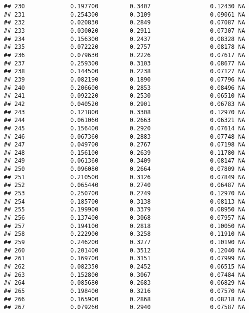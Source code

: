 \documentclass[
]{article}
\begin{document}
\begin{verbatim}
## 230             0.197700         0.3407                 0.12430 NA
## 231             0.254300         0.3109                 0.09061 NA
## 232             0.020830         0.2849                 0.07087 NA
## 233             0.030020         0.2911                 0.07307 NA
## 234             0.156300         0.2437                 0.08328 NA
## 235             0.072220         0.2757                 0.08178 NA
## 236             0.079630         0.2226                 0.07617 NA
## 237             0.259300         0.3103                 0.08677 NA
## 238             0.144500         0.2238                 0.07127 NA
## 239             0.082190         0.1890                 0.07796 NA
## 240             0.206600         0.2853                 0.08496 NA
## 241             0.092220         0.2530                 0.06510 NA
## 242             0.040520         0.2901                 0.06783 NA
## 243             0.121800         0.3308                 0.12970 NA
## 244             0.061060         0.2663                 0.06321 NA
## 245             0.156400         0.2920                 0.07614 NA
## 246             0.067360         0.2883                 0.07748 NA
## 247             0.049700         0.2767                 0.07198 NA
## 248             0.156100         0.2639                 0.11780 NA
## 249             0.061360         0.3409                 0.08147 NA
## 250             0.096080         0.2664                 0.07809 NA
## 251             0.210500         0.3126                 0.07849 NA
## 252             0.065440         0.2740                 0.06487 NA
## 253             0.250700         0.2749                 0.12970 NA
## 254             0.185700         0.3138                 0.08113 NA
## 255             0.199900         0.3379                 0.08950 NA
## 256             0.137400         0.3068                 0.07957 NA
## 257             0.194100         0.2818                 0.10050 NA
## 258             0.222900         0.3258                 0.11910 NA
## 259             0.246200         0.3277                 0.10190 NA
## 260             0.201400         0.3512                 0.12040 NA
## 261             0.169700         0.3151                 0.07999 NA
## 262             0.082350         0.2452                 0.06515 NA
## 263             0.152800         0.3067                 0.07484 NA
## 264             0.085680         0.2683                 0.06829 NA
## 265             0.198400         0.3216                 0.07570 NA
## 266             0.165900         0.2868                 0.08218 NA
## 267             0.079260         0.2940                 0.07587 NA

\end{verbatim}
\end{document}
